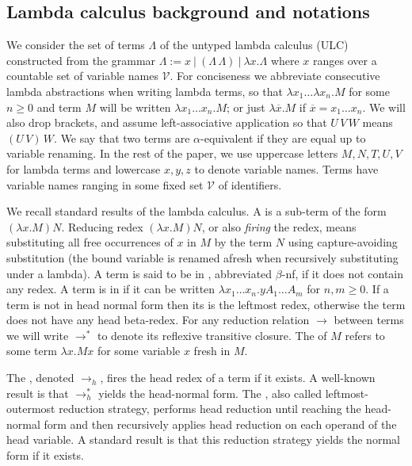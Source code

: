 \documentclass{elsarticle}
\theoremstyle{plain}
\theoremstyle{definition}
\newcommand\VarSet{\mathcal{V}}
\begin{document}
\subsection{Lambda calculus background and notations}
\label{sec:lambdacalculus_basics}

We consider the set of terms $\Lambda$ of the untyped lambda calculus (ULC) constructed from the grammar $\Lambda := x\ |\ (\Lambda\, \Lambda)\ |\ \lambda x. \Lambda $
where $x$ ranges over a countable set of variable names $\VarSet$.
For conciseness we abbreviate consecutive lambda abstractions when writing lambda terms, so that $\lambda x_1 \ldots \lambda x_n . M$ for some $n\geq 0$ and term $M$ will be written $\lambda x_1 \ldots x_n . M$; or just
$\lambda \overline{x} . M$ if $\overline{x} = x_1 \ldots x_n$.
We will also drop brackets, and assume left-associative application so that $U\,V\,W$ means $(U\,V)\,W$. We say that two terms are $\alpha$-equivalent if they are equal up to variable renaming.
In the rest of the paper, we use uppercase letters $M, N, T, U, V$ for lambda terms and lowercase $x,y,z$ to denote variable names. Terms have variable names ranging in some fixed set $\VarSet$ of identifiers.

We recall standard results of the lambda calculus.
A  is a sub-term of the form $(\lambda x. M) N$.
Reducing redex $(\lambda x. M) N$, or also \emph{firing} the redex, means substituting all free occurrences of $x$ in $M$ by the term $N$
using capture-avoiding substitution (the bound variable is renamed afresh when recursively substituting under a lambda).
A term is said to be in , abbreviated $\beta$-nf, if it does not contain any redex.
A term is in  if it can be written $\lambda x_1 \ldots x_n . y A_1 \ldots A_m$ for $n,m\geq0$. If a term is not in head normal form then its  is the leftmost redex, otherwise the term does not have any head beta-redex. For any reduction relation $\rightarrow$ between terms we will write $\rightarrow^*$ to denote its reflexive transitive closure. The  of $M$ refers to some term $\lambda x. M x $ for some variable $x$ fresh in $M$.

The , denoted $\rightarrow_{h}$, fires the head redex of a term if it exists.
A well-known result is that $\rightarrow^*_{h}$ yields the head-normal form. The , also called leftmost-outermost reduction strategy, performs head reduction until reaching the head-normal form and then recursively applies head reduction on each operand of the head variable. A standard result is that this reduction strategy yields the normal form if it exists.
\end{document}
